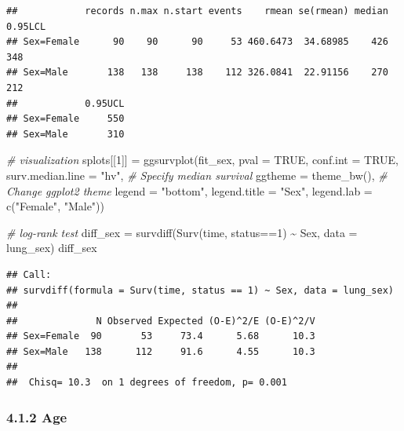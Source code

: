 \documentclass[
]{article}
\newenvironment{Shaded}{\begin{snugshade}}{\end{snugshade}}
\newcommand{\AttributeTok}[1]{\textcolor[rgb]{0.77,0.63,0.00}{#1}}
\newcommand{\CommentTok}[1]{\textcolor[rgb]{0.56,0.35,0.01}{\textit{#1}}}
\newcommand{\ConstantTok}[1]{\textcolor[rgb]{0.00,0.00,0.00}{#1}}
\newcommand{\DecValTok}[1]{\textcolor[rgb]{0.00,0.00,0.81}{#1}}
\newcommand{\FunctionTok}[1]{\textcolor[rgb]{0.00,0.00,0.00}{#1}}
\newcommand{\NormalTok}[1]{#1}
\newcommand{\OtherTok}[1]{\textcolor[rgb]{0.56,0.35,0.01}{#1}}
\newcommand{\SpecialCharTok}[1]{\textcolor[rgb]{0.00,0.00,0.00}{#1}}
\newcommand{\StringTok}[1]{\textcolor[rgb]{0.31,0.60,0.02}{#1}}
\begin{document}
\begin{verbatim}
##            records n.max n.start events    rmean se(rmean) median 0.95LCL
## Sex=Female      90    90      90     53 460.6473  34.68985    426     348
## Sex=Male       138   138     138    112 326.0841  22.91156    270     212
##            0.95UCL
## Sex=Female     550
## Sex=Male       310
\end{verbatim}

\begin{Shaded}
\begin{Highlighting}[]
\CommentTok{\# visualization}
\NormalTok{splots[[}\DecValTok{1}\NormalTok{]] }\OtherTok{=} \FunctionTok{ggsurvplot}\NormalTok{(fit\_sex,}
                         \AttributeTok{pval =} \ConstantTok{TRUE}\NormalTok{, }\AttributeTok{conf.int =} \ConstantTok{TRUE}\NormalTok{,}
                         \AttributeTok{surv.median.line =} \StringTok{"hv"}\NormalTok{, }\CommentTok{\# Specify median survival}
                         \AttributeTok{ggtheme =} \FunctionTok{theme\_bw}\NormalTok{(), }\CommentTok{\# Change ggplot2 theme}
                         \AttributeTok{legend =} \StringTok{"bottom"}\NormalTok{, }
                         \AttributeTok{legend.title =} \StringTok{"Sex"}\NormalTok{,}
                         \AttributeTok{legend.lab =} \FunctionTok{c}\NormalTok{(}\StringTok{"Female"}\NormalTok{, }\StringTok{"Male"}\NormalTok{))}

\CommentTok{\# log{-}rank test}
\NormalTok{diff\_sex }\OtherTok{=} \FunctionTok{survdiff}\NormalTok{(}\FunctionTok{Surv}\NormalTok{(time, status}\SpecialCharTok{==}\DecValTok{1}\NormalTok{) }\SpecialCharTok{\textasciitilde{}}\NormalTok{ Sex, }\AttributeTok{data =}\NormalTok{ lung\_sex) }
\NormalTok{diff\_sex}
\end{Highlighting}
\end{Shaded}

\begin{verbatim}
## Call:
## survdiff(formula = Surv(time, status == 1) ~ Sex, data = lung_sex)
## 
##              N Observed Expected (O-E)^2/E (O-E)^2/V
## Sex=Female  90       53     73.4      5.68      10.3
## Sex=Male   138      112     91.6      4.55      10.3
## 
##  Chisq= 10.3  on 1 degrees of freedom, p= 0.001
\end{verbatim}

\hypertarget{age}{%
\subsubsection{4.1.2 Age}\label{age}}
\end{document}
